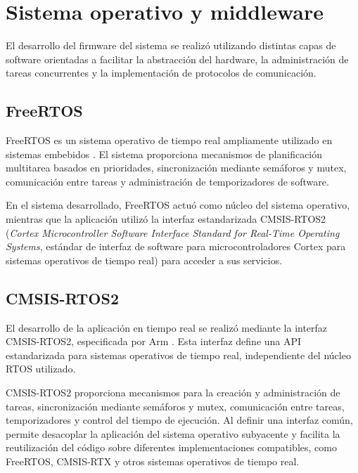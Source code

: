 
\section{Sistema operativo y middleware}

El desarrollo del firmware del sistema se realizó utilizando distintas capas de software orientadas a facilitar la abstracción del hardware, la administración de tareas concurrentes y la implementación de protocolos de comunicación.

\subsection{FreeRTOS}

FreeRTOS es un sistema operativo de tiempo real ampliamente utilizado en sistemas embebidos \cite{freertos}. El sistema proporciona mecanismos de planificación multitarea basados en prioridades, sincronización mediante semáforos y mutex, comunicación entre tareas y administración de temporizadores de software.

En el sistema desarrollado, FreeRTOS actuó como núcleo del sistema operativo, mientras que la aplicación utilizó la interfaz estandarizada CMSIS-RTOS2 (\textit{Cortex Microcontroller Software Interface Standard for Real-Time Operating Systems}, estándar de interfaz de software para microcontroladores Cortex para sistemas operativos de tiempo real) para acceder a sus servicios.

\subsection{CMSIS-RTOS2}

El desarrollo de la aplicación en tiempo real se realizó mediante la interfaz CMSIS-RTOS2, especificada por Arm \cite{cmsisrtos2}. Esta interfaz define una API estandarizada para sistemas operativos de tiempo real, independiente del núcleo RTOS utilizado.

CMSIS-RTOS2 proporciona mecanismos para la creación y administración de tareas, sincronización mediante semáforos y mutex, comunicación entre tareas, temporizadores y control del tiempo de ejecución. Al definir una interfaz común, permite desacoplar la aplicación del sistema operativo subyacente y facilita la reutilización del código sobre diferentes implementaciones compatibles, como FreeRTOS, CMSIS-RTX y otros sistemas operativos de tiempo real.


